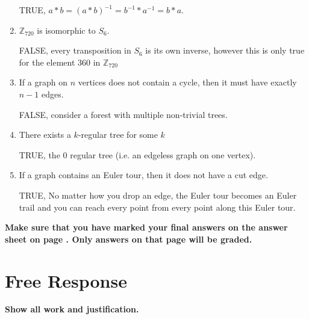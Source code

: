 \documentclass[12pt]{article}
\begin{document}
\begin{enumerate}
TRUE, $a*b=(a*b)^{-1}=b^{-1}*a^{-1}=b*a$.
\vspace{0.1cm}
\item $\mathbb{Z}_{720}$ is isomorphic to $S_6$.

FALSE, every transposition in $S_6$ is its own inverse, however this is only true for the element 360 in $\mathbb{Z}_{720}$
\vspace{0.1cm}
\item If a graph on $n$ vertices does not contain a cycle, then it must have exactly $n-1$ edges.

FALSE, consider a forest with multiple non-trivial trees.
\vspace{0.1cm}
\item There exists a $k$-regular tree for some $k$

TRUE, the $0$ regular tree (i.e. an edgeless graph on one vertex).
\vspace{0.1cm}
\item If a graph contains an Euler tour, then it does not have a cut edge.

TRUE, No matter how you drop an edge, the Euler tour becomes an Euler trail and you can reach every point from every point along this Euler tour.
\end{enumerate}
\begin{center}
\textbf{Make sure that you have marked your final answers on the answer sheet on page \pageref{answersheet}. Only answers on that page will be graded.}
\end{center}
\newpage
\section*{Free Response}

\textbf{Show all work and justification.} 
\end{document}
